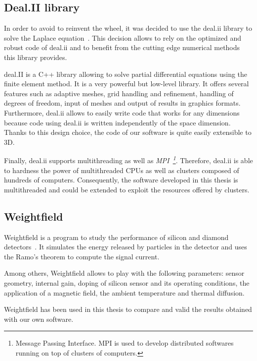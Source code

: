 \documentclass[11pt]{article}
\begin{document}
	\subsection{Deal.II library}

		In order to avoid to reinvent the wheel, it was decided to use the deal.ii library
		to solve the Laplace equation~\cite{Bangerth:2007:DGO:1268776.1268779}. This decision allows to rely on the optimized
		and robust code of deal.ii and to benefit from the cutting edge numerical methods this library provides.

		deal.II is a C++ library allowing to solve partial differential equations
		using the finite element method. It is a very powerful but low-level library.
		It offers several features such as adaptive meshes, grid handling
		and refinement, handling of degrees of freedom, input of meshes and output of results in
		graphics formats. Furthermore, deal.ii allows to easily write code that works
		for any dimensions because code using deal.ii is written independently of the space
		dimension. Thanks to this design choice, the code of our software is quite easily
		extensible to 3D.

		Finally, deal.ii supports multithreading as well as \textit{MPI~\footnote{Message
		Passing Interface. MPI is used to develop distributed softwares running on top of
		clusters of computers.}}. Therefore,
		deal.ii is able to hardness the power of multithreaded CPUs as well as
		clusters composed of hundreds of computers. Consequently,
		the software developed in this thesis is multithreaded and could be extended to
		exploit the resources offered by clusters.


	\subsection{Weightfield}

		Weightfield is a program to study the performance of silicon and diamond
		detectors~\cite{Cenna2015}. It simulates the energy released by particles in the detector
		and uses the Ramo's theorem to compute the signal current.

		Among others, Weightfield allows to play with the following parameters:
		sensor geometry, internal gain, doping of silicon sensor and its operating
		conditions, the application of a magnetic field, the ambient temperature and
		thermal diffusion.

		Weightfield has been used in this thesis to compare and valid the results
		obtained with our own software.
\end{document}
